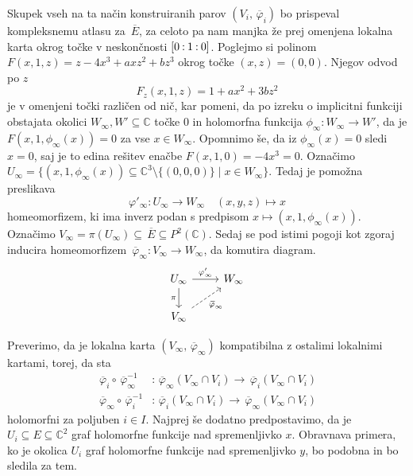 \documentclass[mat1]{fmfdelo}
\numberwithin{equation}{section}
\newcommand{\C}{\mathbb C}
\newcommand{\PC}{P^2(\mathbb C)}
\newcommand{\inv}{^{-1}}
\newcommand{\pcoor}[1]{%
\begingroup\lccode`~=`: \lowercase{\endgroup
\edef~}{\mathbin{\mathchar\the\mathcode`:}\nobreak}%
\left[%
\begingroup
\mathcode`:=\string"8000
#1%
\endgroup
\right]%
}
\newcommand{\olsi}[1]{\,\overline{\!{#1}}} %
\theoremstyle{definition}
\begin{document}
Skupek vseh na ta način konstruiranih parov $(V_i, \olsi{\varphi}_i)$ bo prispeval kompleksnemu atlasu za $\olsi{E}$, za celoto pa nam manjka že prej omenjena lokalna karta okrog točke v neskončnosti $\pcoor{0 : 1 : 0}$. Poglejmo si polinom $F(x, 1, z) = z - 4x^3 + axz^2 + bz^3$ okrog točke $(x,z) = (0,0)$. Njegov odvod po $z$ 
\[
    F_z(x,1,z) = 1 + ax^2 + 3bz^2
\]
je v omenjeni točki različen od nič, kar pomeni, da po izreku o implicitni funkciji obstajata okolici $W_\infty, W' \subseteq \C$ točke $0$ in holomorfna funkcija $\phi_\infty : W_\infty \to W'$, da je $F(x, 1, \phi_\infty(x)) = 0$ za vse $x \in W_\infty$. Opomnimo še, da iz $\phi_\infty(x) = 0$ sledi $x = 0$, saj je to edina rešitev enačbe $F(x, 1, 0) = -4x^3 = 0$. Označimo $U_\infty = \{(x, 1, \phi_\infty(x)) \subseteq \C^3 \setminus \{(0,0,0)\}\mid x \in W_\infty\}$. Tedaj je pomožna preslikava 
\[
    \varphi'_\infty : U_\infty \to W_\infty \quad (x,y,z) \mapsto x
\]
homeomorfizem, ki ima inverz podan s predpisom $x \mapsto (x,1,\phi_\infty(x))$. Označimo $V_\infty = \pi(U_\infty) \subseteq \olsi{E} \subseteq \PC$. Sedaj se pod istimi pogoji kot zgoraj inducira homeomorfizem $\olsi{\varphi}_\infty : V_\infty \to W_\infty$, da komutira diagram.
\begin{equation}
    \label{projektivna karta v inf diagram}    
    \begin{tikzcd}
        U_\infty \arrow{r}{\varphi'_\infty} \ar[labels=left]{d}{\pi} & W_\infty \\
        V_\infty \ar[dashed, labels=below right]{ur}{\olsi{\varphi}_\infty}
    \end{tikzcd}
\end{equation}   

Preverimo, da je lokalna karta $(V_\infty, \olsi{\varphi}_\infty)$ kompatibilna z ostalimi lokalnimi kartami, torej, da sta
\begin{align*}
    \olsi{\varphi}_i \circ \olsi{\varphi}_\infty\inv &: \olsi{\varphi}_\infty(V_\infty \cap V_i) \to \olsi{\varphi}_i(V_\infty \cap V_i) \\
    \olsi{\varphi}_\infty \circ \olsi{\varphi}_i\inv &: \olsi{\varphi}_i(V_\infty \cap V_i) \to \olsi{\varphi}_\infty(V_\infty \cap V_i)
\end{align*}
holomorfni za poljuben $i \in I$. Najprej še dodatno predpostavimo, da je $U_i \subseteq E \subseteq \C^2$ graf holomorfne funkcije nad spremenljivko $x$. Obravnava primera, ko je okolica $U_i$ graf holomorfne funkcije nad spremenljivko $y$, bo podobna in bo sledila za tem.
\end{document}
